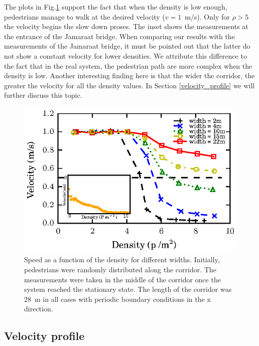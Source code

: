 The plots in Fig.\ref{fundamental_diagram_speed} support the fact that when the density is low enough, pedestrians manage to walk at the desired velocity ($v=1$~m/s). Only for $\rho>5$ the velocity begins the slow down proses. The inset shows the measurements at the entrance of the Jamaraat bridge. When comparing our results with the measurements of the Jamaraat bridge, it must be pointed out that the latter do not show a constant velocity for lower densities. We attribute this difference to the fact that in the real system, the pedestrian path are more complex when the density is low. Another interesting finding here is that the wider the corridor, the greater the velocity for all the density values. In Section \ref{velocity_profile} we will further discuss this topic.

\begin{figure}[htbp!]
\includegraphics[width=\columnwidth]
{plots/speed-density_vd1_multiple_widths.eps}
\caption{\label{fundamental_diagram_speed} Speed as a function of the density for different widths. Initially, 
pedestrians were randomly distributed along the corridor. The measurements were taken in the middle
of the corridor once the system reached the stationary state. The length of the corridor 
was 28~m in all cases with periodic boundary conditions in the x direction.}
\end{figure}

\subsection{\label{velocity_profile} Velocity profile}

